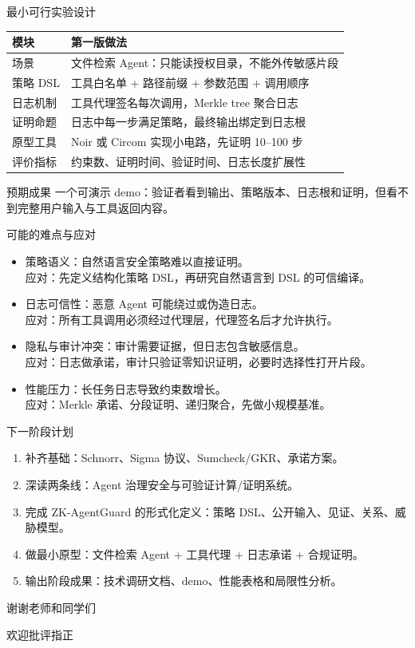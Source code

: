 \documentclass[aspectratio=169]{beamer}
\newcommand{\kw}[1]{\textcolor{uestc}{\heiti #1}}
\begin{document}
\begin{frame}{最小可行实验设计}
  \begin{table}
    \centering
    \small
    \begin{tabular}{ll}
      \toprule
      模块 & 第一版做法 \\
      \midrule
      场景 & 文件检索 Agent：只能读授权目录，不能外传敏感片段 \\
      策略 DSL & 工具白名单 + 路径前缀 + 参数范围 + 调用顺序 \\
      日志机制 & 工具代理签名每次调用，Merkle tree 聚合日志 \\
      证明命题 & 日志中每一步满足策略，最终输出绑定到日志根 \\
      原型工具 & Noir 或 Circom 实现小电路，先证明 10--100 步 \\
      评价指标 & 约束数、证明时间、验证时间、日志长度扩展性 \\
      \bottomrule
    \end{tabular}
  \end{table}
  \begin{block}{预期成果}
    一个可演示 demo：验证者看到输出、策略版本、日志根和证明，但看不到完整用户输入与工具返回内容。
  \end{block}
\end{frame}

\begin{frame}{可能的难点与应对}
  \begin{itemize}
    \item \kw{策略语义}：自然语言安全策略难以直接证明。\\
      应对：先定义结构化策略 DSL，再研究自然语言到 DSL 的可信编译。
    \item \kw{日志可信性}：恶意 Agent 可能绕过或伪造日志。\\
      应对：所有工具调用必须经过代理层，代理签名后才允许执行。
    \item \kw{隐私与审计冲突}：审计需要证据，但日志包含敏感信息。\\
      应对：日志做承诺，审计只验证零知识证明，必要时选择性打开片段。
    \item \kw{性能压力}：长任务日志导致约束数增长。\\
      应对：Merkle 承诺、分段证明、递归聚合，先做小规模基准。
  \end{itemize}
\end{frame}

\begin{frame}{下一阶段计划}
  \begin{enumerate}
    \item 补齐基础：Schnorr、Sigma 协议、Sumcheck/GKR、承诺方案。
    \item 深读两条线：Agent 治理安全与可验证计算/证明系统。
    \item 完成 ZK-AgentGuard 的形式化定义：策略 DSL、公开输入、见证、关系、威胁模型。
    \item 做最小原型：文件检索 Agent + 工具代理 + 日志承诺 + 合规证明。
    \item 输出阶段成果：技术调研文档、demo、性能表格和局限性分析。
  \end{enumerate}
\end{frame}

\begin{frame}
  \begin{center}
    {\Huge 谢谢老师和同学们}

    \vspace{1em}
    \Large 欢迎批评指正
  \end{center}
\end{frame}
\end{document}
